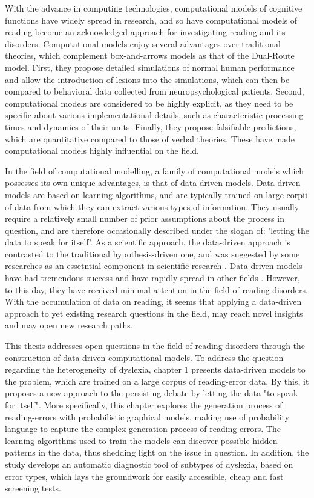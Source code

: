With the advance in computing technologies, computational models of cognitive functions have widely spread in research, and so have computational models of reading become an acknowledged approach for investigating  reading and its disorders. Computational models enjoy several advantages over traditional theories, which complement box-and-arrows models as that of the Dual-Route model. First, they propose detailed simulations of normal human performance and allow the introduction of lesions into the simulations, which can then be compared to behavioral data collected from neuropsychological patients. Second, computational models are considered to be highly explicit, as they need to be specific about various implementational details, such as characteristic processing times and dynamics of their units. Finally, they propose falsifiable predictions, which are quantitative compared to those of verbal theories. These have  made computational models highly influential on the field.

In the field of computational modelling, a family of computational models which possesses its own unique advantages, is that of data-driven models. Data-driven models are based on learning algorithms, and are typically trained on large corpii of data from which they can extract various types of information. They usually require a relatively small number of prior assumptions about the process in question, and are therefore occasionally described under the slogan of: 'letting the data to speak for itself'. As a scientific approach, the data-driven approach is contrasted to the traditional hypothesis-driven one, and was suggested by some researches as an essetntial component in scientific research \citep{kell2004here}. Data-driven models have had tremendous success and have rapidly spread in other fields \citep{bell2009beyond, leonelli2014difference, lecun2015deep}. However, to this day, they have received minimal attention in the field of reading disorders. With the accumulation of data on reading, it seems that applying a data-driven approach to yet existing research questions in the field, may reach novel insights and may open new research paths.

This thesis addresses open questions in the field of reading disorders through the construction of data-driven computational models. To address the question regarding the heterogeneity of dyslexia, chapter 1 presents data-driven models to the problem, which are trained on a large corpus of reading-error data. By this, it proposes a new approach to the persisting debate by letting the data "to speak for itself". More specifically, this chapter explores the generation process of reading-errors with probabilistic graphical models, making use of probability language to capture the complex generation process of reading errors. The learning algorithms used to train the models can discover possible hidden patterns in the data, thus shedding light on the issue in question. In addition, the study develops an automatic diagnostic tool of subtypes of dyslexia, based on error types, which lays the groundwork for easily accessible, cheap and fast screening tests. 

